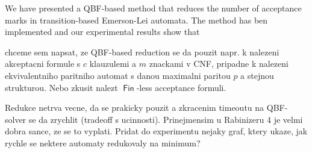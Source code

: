 \documentclass[a4paper,UKenglish,cleveref, autoref, thm-restate]{lipics-v2021}
\DeclareMathOperator{\Fin}{\mathsf{Fin}}
\begin{document}
We have presented a QBF-based method that reduces the number of
acceptance marks in transition-based Emerson-Lei automata. The method
has ben implemented and our experimental results show that

chceme sem napsat, ze QBF-based reduction se da pouzit napr. k
nalezeni akceptacni formule s $c$ klauzulemi a $m$ znackami v CNF,
pripadne k nalezeni ekvivalentniho paritniho automat s danou maximalni
paritou $p$ a stejnou strukturou. Nebo zkusit nalezt $\Fin$-less
acceptance formuli.

Redukce netrva vecne, da se prakicky pouzit a zkracenim timeoutu na
QBF-solver se da zrychlit (tradeoff s ucinnosti). Prinejmensim u
Rabinizeru 4 je velmi dobra sance, ze se to vyplati. Pridat do
experimentu nejaky graf, ktery ukaze, jak rychle se nektere automaty
redukovaly na minimum?


%

\end{document}
